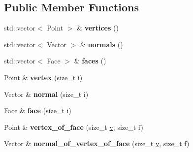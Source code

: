 \subsection*{Public Member Functions}
\begin{DoxyCompactItemize}
\item 
\hypertarget{class_d_o_1_1_simple_mesh_a4610f007d7ba928346ea0d9c80210b89}{std\-::vector$<$ Point $>$ \& {\bfseries vertices} ()}\label{class_d_o_1_1_simple_mesh_a4610f007d7ba928346ea0d9c80210b89}

\item 
\hypertarget{class_d_o_1_1_simple_mesh_a3313a9f1de5f63e9c74add9afb1f14ee}{std\-::vector$<$ Vector $>$ \& {\bfseries normals} ()}\label{class_d_o_1_1_simple_mesh_a3313a9f1de5f63e9c74add9afb1f14ee}

\item 
\hypertarget{class_d_o_1_1_simple_mesh_a4cc70785d08ebebc4df3e2d9cb603bfb}{std\-::vector$<$ Face $>$ \& {\bfseries faces} ()}\label{class_d_o_1_1_simple_mesh_a4cc70785d08ebebc4df3e2d9cb603bfb}

\item 
\hypertarget{class_d_o_1_1_simple_mesh_a87f418d4394ff3f5d938b001cdea64e3}{Point \& {\bfseries vertex} (size\-\_\-t i)}\label{class_d_o_1_1_simple_mesh_a87f418d4394ff3f5d938b001cdea64e3}

\item 
\hypertarget{class_d_o_1_1_simple_mesh_a83d364654c11d9af7b0b73872df412dc}{Vector \& {\bfseries normal} (size\-\_\-t i)}\label{class_d_o_1_1_simple_mesh_a83d364654c11d9af7b0b73872df412dc}

\item 
\hypertarget{class_d_o_1_1_simple_mesh_a08e3f8b85341fe7bd5f44a37a1734283}{Face \& {\bfseries face} (size\-\_\-t i)}\label{class_d_o_1_1_simple_mesh_a08e3f8b85341fe7bd5f44a37a1734283}

\item 
\hypertarget{class_d_o_1_1_simple_mesh_ae0a8f4e6ca684c4e43dc3dd18fcb5530}{Point \& {\bfseries vertex\-\_\-of\-\_\-face} (size\-\_\-t \hyperlink{group___channel_accessors_ga1dd2524c5b8d3db33137eedb803fc2ce}{v}, size\-\_\-t f)}\label{class_d_o_1_1_simple_mesh_ae0a8f4e6ca684c4e43dc3dd18fcb5530}

\item 
\hypertarget{class_d_o_1_1_simple_mesh_a1e445f3a0e3d6f411423af8ab8439dd5}{Vector \& {\bfseries normal\-\_\-of\-\_\-vertex\-\_\-of\-\_\-face} (size\-\_\-t \hyperlink{group___channel_accessors_ga1dd2524c5b8d3db33137eedb803fc2ce}{v}, size\-\_\-t f)}\label{class_d_o_1_1_simple_mesh_a1e445f3a0e3d6f411423af8ab8439dd5}


\end{DoxyCompactItemize}
